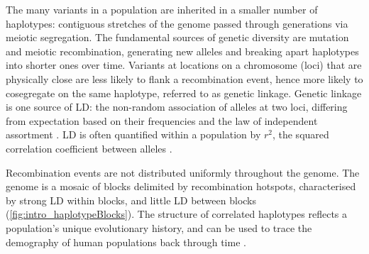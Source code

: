 \begin{outline}
\1 The many variants in a population are inherited in a smaller number of haplotypes: 
contiguous stretches of the genome passed through generations via meiotic segregation.
The fundamental sources of genetic diversity are mutation and meiotic recombination, generating new alleles and breaking apart haplotypes into shorter ones over time.
Variants at locations on a chromosome (loci) that are physically close are less likely to flank a recombination event, hence more likely to cosegregate on the same haplotype, referred to as genetic linkage.
Genetic linkage is one source of \gls{LD}: the non-random association of alleles at two loci, differing from expectation based on their frequencies and the law of independent assortment \autocite{slatkin2008LinkageDisequilibriumUnderstanding}.
\gls{LD} is often quantified within a population by $r^2$, the squared correlation coefficient between alleles \autocite{slatkin2008LinkageDisequilibriumUnderstanding}.

Recombination events are not distributed uniformly throughout the genome.
The genome is a mosaic of blocks delimited by recombination hotspots, 
characterised by strong \gls{LD} within blocks, and little \gls{LD} between blocks \autocite{wall2003HaplotypeBlocksLinkage,theinternationalhapmapconsortium2007SecondGenerationHuman} (\autoref{fig:intro_haplotypeBlocks}).
The structure of correlated haplotypes reflects a population's unique evolutionary history, and can be used to trace the demography of human populations back through time \autocite{karczewski2020AnalyticTranslationalGenetics}.


\end{outline}
